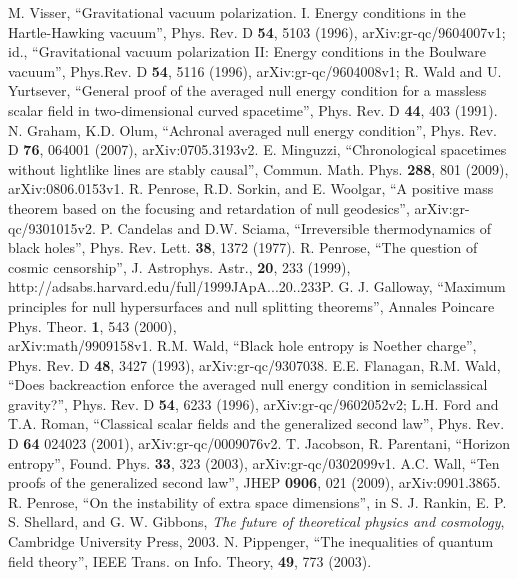 \documentclass[11pt]{article}
\begin{document}
\begin{thebibliography}{99}
M. Visser, ``Gravitational vacuum polarization. I. Energy conditions in the Hartle-Hawking vacuum'', Phys. Rev. D \textbf{54}, 5103 (1996), arXiv:gr-qc/9604007v1; id., ``Gravitational vacuum polarization II: Energy conditions in the Boulware vacuum'', Phys.Rev. D \textbf{54}, 5116 (1996), arXiv:gr-qc/9604008v1;
R. Wald and U. Yurtsever, ``General proof of the averaged null energy condition for a massless scalar field in two-dimensional curved spacetime'', Phys. Rev. D \textbf{44}, 403 (1991).
N. Graham, K.D. Olum, ``Achronal averaged null energy condition'', Phys. Rev. D \textbf{76}, 064001 (2007), arXiv:0705.3193v2.
E. Minguzzi, ``Chronological spacetimes without lightlike lines are stably causal'', Commun. Math. Phys. \textbf{288}, 801 (2009), arXiv:0806.0153v1.
R. Penrose, R.D. Sorkin, and E. Woolgar, ``A positive mass theorem based on the focusing and retardation of null geodesics'', arXiv:gr-qc/9301015v2.
P. Candelas and D.W. Sciama, ``Irreversible thermodynamics of black holes'', Phys. Rev. Lett. \textbf{38}, 1372 (1977).
R. Penrose, ``The question of cosmic censorship'', J. Astrophys. Astr., \textbf{20}, 233 (1999), http://adsabs.harvard.edu/full/1999JApA...20..233P.
G. J. Galloway, ``Maximum principles for null hypersurfaces and null splitting theorems'', Annales Poincare Phys. Theor. \textbf{1}, 543 (2000), \\ arXiv:math/9909158v1.
R.M. Wald, ``Black hole entropy is Noether charge'', Phys. Rev. D \textbf{48}, 3427 (1993), arXiv:gr-qc/9307038.
E.E. Flanagan, R.M. Wald, ``Does backreaction enforce the averaged null energy condition in semiclassical gravity?'', Phys. Rev. D \textbf{54}, 6233 (1996), arXiv:gr-qc/9602052v2; L.H. Ford and T.A. Roman, ``Classical scalar fields and the generalized second law'', Phys. Rev. D \textbf{64} 024023 (2001), arXiv:gr-qc/0009076v2.
T. Jacobson, R. Parentani, ``Horizon entropy'', Found. Phys. \textbf{33}, 323 (2003), arXiv:gr-qc/0302099v1.
A.C. Wall, ``Ten proofs of the generalized second law'', JHEP \textbf{0906}, 021 (2009), arXiv:0901.3865.
R. Penrose, ``On the instability of extra space dimensions'', in S. J. Rankin, E. P. S. Shellard, and G. W. Gibbons, \textit{The future of theoretical physics and cosmology}, Cambridge University Press, 2003.
N. Pippenger, ``The inequalities of quantum field theory'', IEEE Trans. on Info. Theory, \textbf{49}, 773 (2003).

\end{thebibliography}
\end{document}
